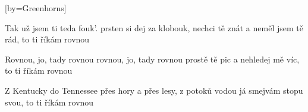 [by={Greenhorns}]

\beginverse{}
Tak už jsem ti teda fouk'. 
prsten si dej za klobouk,
nechci tě znát a neměl jsem tě rád,
to ti říkám rovnou
\endverse{}

\beginchorus{}
Rovnou, jo, tady rovnou 
rovnou, jo, tady rovnou
prostě tě pic a nehledej mě víc,
to ti říkám rovnou
\endchorus{}

\beginverse{}
Z Kentucky do Tennessee 
přes hory a přes lesy,
z potoků vodou já smejvám stopu svou,
to ti říkám rovnou
\endverse{}

\beginchorus{}

\endchorus{}

\endsong{}
